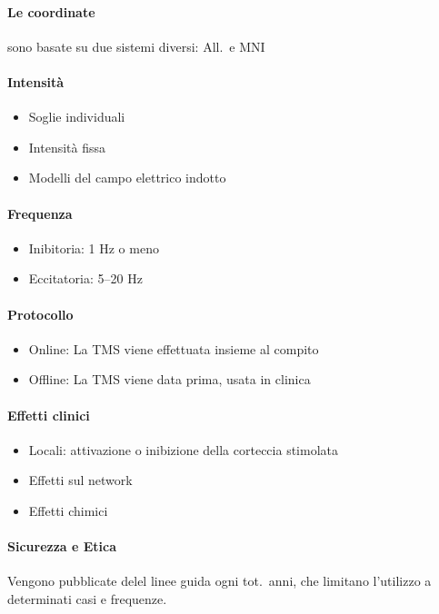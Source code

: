 \documentclass[12pt, a4paper]{article}
\begin{document}
\paragraph{Le coordinate}  sono basate su due sistemi diversi: All.\ e MNI

\paragraph{Intensità}  
\begin{itemize}
    \item Soglie individuali
    \item Intensità fissa
    \item Modelli del campo elettrico indotto
\end{itemize}

\paragraph{Frequenza}  
\begin{itemize}
    \item Inibitoria: 1 Hz o meno
    \item Eccitatoria: 5--20 Hz
\end{itemize}

\paragraph{Protocollo}  
\begin{itemize}
    \item Online: La TMS viene effettuata insieme al compito
    \item Offline: La TMS viene data prima, usata in clinica
\end{itemize}

\paragraph{Effetti clinici}  
\begin{itemize}
    \item Locali: attivazione o inibizione della corteccia stimolata
    \item Effetti sul network
    \item Effetti chimici
\end{itemize}

\paragraph{Sicurezza e Etica}  Vengono pubblicate delel linee guida ogni tot.\ anni, che limitano l'utilizzo a determinati casi e frequenze.
\end{document}
